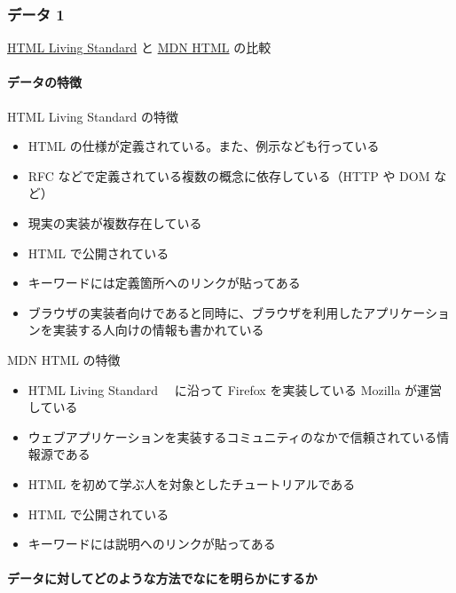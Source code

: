 \hypertarget{ux30c7ux30fcux30bf-1-1}{%
\subsubsection{データ 1}\label{ux30c7ux30fcux30bf-1-1}}

\href{https://html.spec.whatwg.org/multipage/\#toc-index}{HTML Living
Standard} と
\href{https://developer.mozilla.org/en-US/docs/Learn/HTML}{MDN HTML}
の比較

\hypertarget{ux30c7ux30fcux30bfux306eux7279ux5fb4-1}{%
\paragraph{データの特徴}\label{ux30c7ux30fcux30bfux306eux7279ux5fb4-1}}

HTML Living Standard の特徴

\begin{itemize}
\tightlist
\item
  HTML の仕様が定義されている。また、例示なども行っている
\item
  RFC などで定義されている複数の概念に依存している（HTTP や DOM など）
\item
  現実の実装が複数存在している
\item
  HTML で公開されている
\item
  キーワードには定義箇所へのリンクが貼ってある
\item
  ブラウザの実装者向けであると同時に、ブラウザを利用したアプリケーションを実装する人向けの情報も書かれている
\end{itemize}

MDN HTML の特徴

\begin{itemize}
\tightlist
\item
  HTML Living Standard 　に沿って Firefox を実装している Mozilla
  が運営している
\item
  ウェブアプリケーションを実装するコミュニティのなかで信頼されている情報源である
\item
  HTML を初めて学ぶ人を対象としたチュートリアルである
\item
  HTML で公開されている
\item
  キーワードには説明へのリンクが貼ってある
\end{itemize}

\hypertarget{ux30c7ux30fcux30bfux306bux5bfeux3057ux3066ux3069ux306eux3088ux3046ux306aux65b9ux6cd5ux3067ux306aux306bux3092ux660eux3089ux304bux306bux3059ux308bux304b-1}{%
\paragraph{データに対してどのような方法でなにを明らかにするか}\label{ux30c7ux30fcux30bfux306bux5bfeux3057ux3066ux3069ux306eux3088ux3046ux306aux65b9ux6cd5ux3067ux306aux306bux3092ux660eux3089ux304bux306bux3059ux308bux304b-1}}

